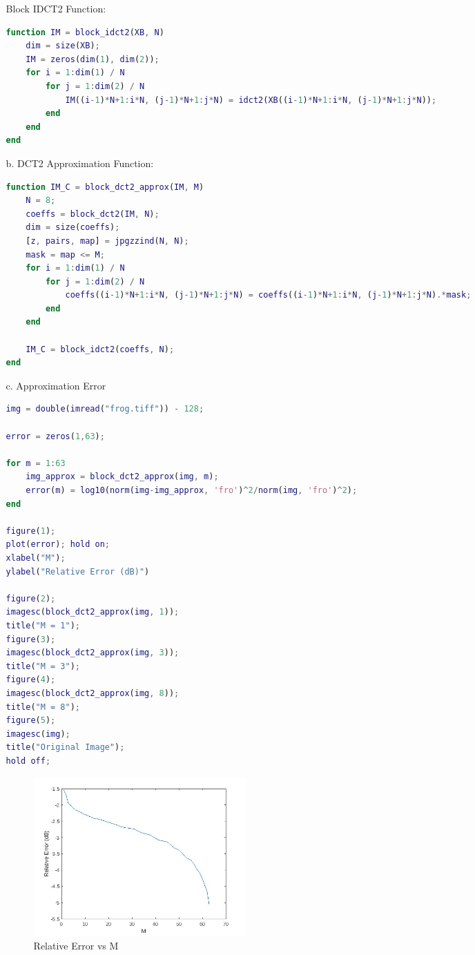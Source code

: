 \documentclass[12pt]{article}
\begin{document}
\begin{enumerate}
\begin{enumerate}
Block IDCT2 Function:
\begin{lstlisting}[language=matlab]
function IM = block_idct2(XB, N)
    dim = size(XB);
    IM = zeros(dim(1), dim(2));
    for i = 1:dim(1) / N
        for j = 1:dim(2) / N
            IM((i-1)*N+1:i*N, (j-1)*N+1:j*N) = idct2(XB((i-1)*N+1:i*N, (j-1)*N+1:j*N));
        end
    end
end
\end{lstlisting}

\item[b.] DCT2 Approximation Function:
\begin{lstlisting}[language=matlab]
function IM_C = block_dct2_approx(IM, M)
    N = 8;
    coeffs = block_dct2(IM, N);
    dim = size(coeffs);
    [z, pairs, map] = jpgzzind(N, N);
    mask = map <= M;
    for i = 1:dim(1) / N
        for j = 1:dim(2) / N
            coeffs((i-1)*N+1:i*N, (j-1)*N+1:j*N) = coeffs((i-1)*N+1:i*N, (j-1)*N+1:j*N).*mask;
        end
    end

    IM_C = block_idct2(coeffs, N);
end
\end{lstlisting}

\newpage

\item[c.] Approximation Error
\begin{lstlisting}[language=matlab]
img = double(imread("frog.tiff")) - 128;

error = zeros(1,63);

for m = 1:63
    img_approx = block_dct2_approx(img, m);
    error(m) = log10(norm(img-img_approx, 'fro')^2/norm(img, 'fro')^2);
end

figure(1);
plot(error); hold on;
xlabel("M");
ylabel("Relative Error (dB)")

figure(2);
imagesc(block_dct2_approx(img, 1));
title("M = 1");
figure(3);
imagesc(block_dct2_approx(img, 3));
title("M = 3");
figure(4);
imagesc(block_dct2_approx(img, 8));
title("M = 8");
figure(5);
imagesc(img); 
title("Original Image");
hold off;
\end{lstlisting}

\begin{figure}[!ht]
    \centering
    \includegraphics[width=3.2in]{2-c1.jpg}
    \caption{Relative Error vs M}
\end{figure}


\end{enumerate}
\end{enumerate}
\end{document}
